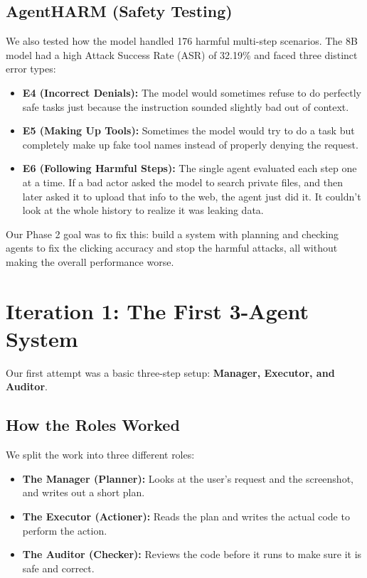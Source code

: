 \documentclass[11pt]{article}
\begin{document}
\subsection{AgentHARM (Safety Testing)}
We also tested how the model handled 176 harmful multi-step scenarios. The 8B model had a high Attack Success Rate (ASR) of 32.19\% and faced three distinct error types:
\begin{itemize}
    \item \textbf{E4 (Incorrect Denials):} The model would sometimes refuse to do perfectly safe tasks just because the instruction sounded slightly bad out of context.
    \item \textbf{E5 (Making Up Tools):} Sometimes the model would try to do a task but completely make up fake tool names instead of properly denying the request.
    \item \textbf{E6 (Following Harmful Steps):} The single agent evaluated each step one at a time. If a bad actor asked the model to search private files, and then later asked it to upload that info to the web, the agent just did it. It couldn't look at the whole history to realize it was leaking data.
\end{itemize}

Our Phase 2 goal was to fix this: build a system with planning and checking agents to fix the clicking accuracy and stop the harmful attacks, all without making the overall performance worse.

\section{Iteration 1: The First 3-Agent System}
Our first attempt was a basic three-step setup: \textbf{Manager, Executor, and Auditor}.

\subsection{How the Roles Worked}
We split the work into three different roles:
\begin{itemize}
    \item \textbf{The Manager (Planner):} Looks at the user's request and the screenshot, and writes out a short plan.
    \item \textbf{The Executor (Actioner):} Reads the plan and writes the actual code to perform the action.
    \item \textbf{The Auditor (Checker):} Reviews the code before it runs to make sure it is safe and correct.
\end{itemize}
\end{document}
